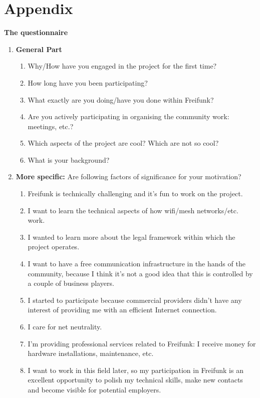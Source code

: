 \section{Appendix}

\textbf{The questionnaire}

\begin{enumerate}[label*=\arabic*.]
  \item \textbf{General Part}
 \begin{enumerate}[label*=\arabic*.]
   \item Why/How have you engaged in the project for the first time?
   \item How long have you been participating?
   \item What exactly are you doing/have you done within Freifunk?
   \item Are you actively participating in organising the community work: meetings, etc.?
   \item Which aspects of the project are cool? Which are not so cool?
   \item What is your background?
 \end{enumerate}

\item \textbf{More specific:} Are following factors of significance for your motivation?
\begin{enumerate}[label*=\arabic*.]
  \item Freifunk is technically challenging and it's fun to work on the project.
  \item I want to learn the technical aspects of how wifi/mesh networks/etc. work.
  \item I wanted to learn more about the legal framework within which the project operates.
  \item I want to have a free communication infrastructure in the hands of the community, because I think it's not a good idea that this is controlled by a couple of business players.
  \item I started to participate because commercial providers didn't have any interest of providing me with an efficient Internet connection.
  \item I care for net neutrality.
  \item I'm providing professional services related to Freifunk: I receive money for hardware installations, maintenance, etc.
  \item I want to work in this field later, so my participation in Freifunk is an excellent opportunity to polish my technical skills, make new contacts and become visible for potential employers.
\end{enumerate}

\end{enumerate}


